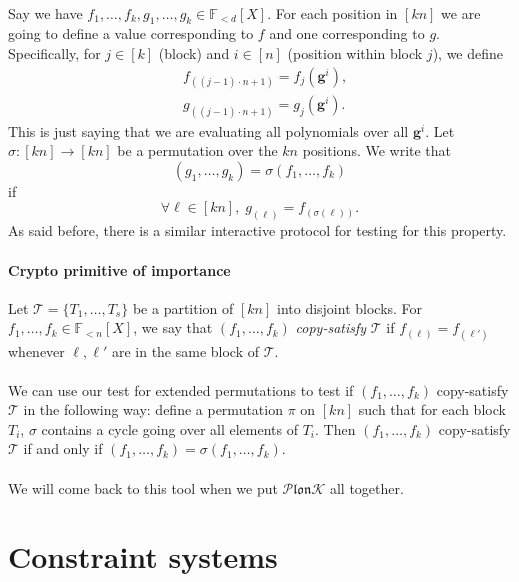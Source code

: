 \documentclass[11pt]{article}
\newcommand{\plonk}{$\mathcal{P} \mathfrak{lon} \mathcal{K}$}
\newcommand{\field}{\mathbb{F}}
\newcommand{\gen}{\mathbf{g}}
\begin{document}
\paragraph{} Say we have $f_1, \ldots, f_k, g_1, \ldots, g_k \in \field_{<d}[X]$. For each position in $[kn]$ we are going to define a value corresponding to $f$ and one corresponding to $g$. Specifically, for $j \in [k]$ (block) and $i \in [n]$ (position within block $j$), we define
\begin{align*}
    &f_{((j - 1) \cdot n + 1)} = f_j (\gen^i), \\
    &g_{((j - 1) \cdot n + 1)} = g_j (\gen^i).
\end{align*}
This is just saying that we are evaluating all polynomials over all $\gen^i$. Let $\sigma: [kn] \rightarrow [kn]$ be a permutation over the $kn$ positions. We write that
\[ (g_1, \ldots, g_k) = \sigma(f_1, \ldots, f_k) \]
if
\[ \forall \ell \in [kn], \; g_{(\ell)} = f_{(\sigma(\ell))}. \]
As said before, there is a similar interactive protocol for testing for this property.

\paragraph{Crypto primitive of importance}
Let $\mathcal{T} = \{T_1, \ldots, T_s\}$ be a partition of $[kn]$ into disjoint blocks. For $f_1, \ldots, f_k \in \field_{<n}[X]$, we say that $(f_1, \ldots, f_k)$ \textit{copy-satisfy} $\mathcal{T}$ if $f_{(\ell)} = f_{(\ell')}$ whenever $\ell, \ell'$ are in the same block of $\mathcal{T}$.

\paragraph{} We can use our test for extended permutations to test if $(f_1, \ldots, f_k)$ copy-satisfy $\mathcal{T}$ in the following way: define a permutation $\pi$ on $[kn]$ such that for each block $T_i$, $\sigma$ contains a cycle going over all elements of $T_i$. Then $(f_1, \ldots, f_k)$ copy-satisfy $\mathcal{T}$ if and only if $(f_1, \ldots, f_k) = \sigma(f_1, \ldots, f_k)$.

\paragraph{} We will come back to this tool when we put \plonk{} all together.

\section{Constraint systems}
\end{document}
